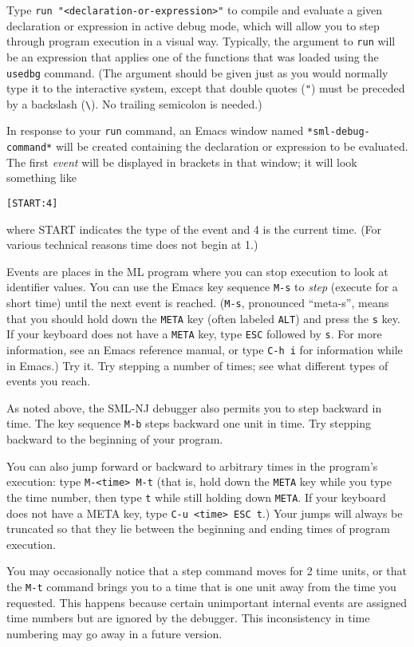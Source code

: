 Type \verb'run "<declaration-or-expression>"' to compile and evaluate a
given declaration or expression in active debug mode, which will allow you 
to step through program execution in a visual way.  
Typically, the argument to \verb'run' will be an expression that applies
one of the functions that was loaded using the \verb'usedbg' command. 
(The argument should be given just as you would normally type
it to the interactive system, except that double quotes (\verb'"') must 
be preceded by a backslash (\verb'\'). No trailing semicolon is needed.)

In response to your \verb'run' command, an Emacs window named
\verb'*sml-debug-command*' will be created containing the declaration or
expression to be evaluated. The first {\em event} will be displayed 
in brackets in that window; it will look something like

\begin{verbatim}
[START:4]
\end{verbatim}
where START indicates the type of the event and 4 is the current
time.  (For various technical reasons time does not begin at 1.)

Events are places in the ML program where you can stop execution to
look at identifier values.  You can use the Emacs key sequence \verb'M-s' to
{\em step} (execute for a short time) until the next event is reached.
(\verb'M-s', pronounced ``meta-s'', means that you should hold down
the \verb'META' key (often labeled \verb'ALT') and press the \verb's'
key.  If your keyboard does not have a \verb'META' key,
type \verb'ESC' followed by \verb's'.  For more information, see an
Emacs reference manual, or type \verb'C-h i' for information while in Emacs.)
Try it.  Try stepping a number of times; see what different types of
events you reach.

As noted above, the SML-NJ debugger also permits you to step {\em}
backward in time.  The key sequence \verb'M-b' steps backward one unit in
time.  Try stepping backward to the beginning of your program.

You can also jump forward or backward to arbitrary times in the 
program's execution: type \verb'M-<time> M-t' (that is,
hold down the \verb'META' key while you type the time number,
then type \verb't' while still holding down \verb'META'.  If your
keyboard does not have a META key, type \verb'C-u <time> ESC t'.)
Your jumps will always be truncated so that they lie between the
beginning and ending times of program execution.

You may occasionally notice that a step command moves for 2 time
units, or that the \verb'M-t' command brings you to a time that is one
unit away from the time you requested.  This happens because certain
unimportant internal events are assigned time numbers but are ignored 
by the debugger.  This inconsistency in time numbering may go away in
a future version.

